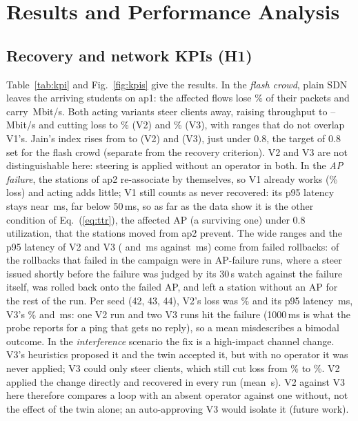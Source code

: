 \documentclass[conference]{IEEEtran}
\begin{document}
\section{Results and Performance Analysis}
\begin{table}[t]
\caption{KPIs of the affected flows (mean and [smallest--largest] over the three seeds; with so few seeds no interval is given). $\geq$ marks a recovery time that includes runs that never recovered (their number in brackets), counted at the run end.}
\label{tab:kpi}
\centering\small

\end{table}

\subsection{Recovery and network KPIs (H1)}
Table~\ref{tab:kpi} and Fig.~\ref{fig:kpis} give the results. In the \emph{flash crowd}, plain SDN leaves the arriving students on ap1: the affected flows lose \KpiFlashLossVone\% of their packets and carry \KpiFlashThrVone\,Mbit/s. Both acting variants steer clients away, raising throughput to \KpiFlashThrVtwo--\KpiFlashThrVthree\,Mbit/s and cutting loss to \KpiFlashLossVtwo\% (V2) and \KpiFlashLossVthree\% (V3), with ranges that do not overlap V1's. Jain's index rises from \FairJainVone{} to \FairJainVtwo{} (V2) and \FairJainVthree{} (V3), just under 0.8, the target of 0.8 set for the flash crowd (separate from the recovery criterion). V2 and V3 are not distinguishable here: steering is applied without an operator in both. In the \emph{AP failure}, the stations of ap2 re-associate by themselves, so V1 already works (\KpiApFailLossVone\% loss) and acting adds little; V1 still counts as never recovered: its p95 latency stays near \KpiApFailLatVone\,ms, far below 50\,ms, so as far as the data show it is the other condition of Eq.~(\ref{eq:ttr}), the affected AP (a surviving one) under 0.8 utilization, that the stations moved from ap2 prevent. The wide ranges and the p95 latency of V2 and V3 (\KpiApFailLatVtwo{} and \KpiApFailLatVthree\,ms against \KpiApFailLatVone\,ms) come from failed rollbacks: \RbFailApFail{} of the \RbFailAll{} rollbacks that failed in the campaign were in AP-failure runs, where a steer issued shortly before the failure was judged by its 30\,s watch against the failure itself, was rolled back onto the failed AP, and left a station without an AP for the rest of the run. Per seed (42, 43, 44), V2's loss was \PerSeedLossApFailVtwo\% and its p95 latency \PerSeedLatApFailVtwo\,ms, V3's \PerSeedLossApFailVthree\% and \PerSeedLatApFailVthree\,ms: one V2 run and two V3 runs hit the failure (1000\,ms is what the probe reports for a ping that gets no reply), so a mean misdescribes a bimodal outcome. In the \emph{interference} scenario the fix is a high-impact channel change. V3's heuristics proposed it and the twin accepted it, but with no operator it was never applied; V3 could only steer clients, which still cut loss from \KpiCochanLossVone\% to \KpiCochanLossVthree\%. V2 applied the change directly and recovered in every run (mean \KpiCochanTtrVtwo\,s). V2 against V3 here therefore compares a loop with an absent operator against one without, not the effect of the twin alone; an auto-approving V3 would isolate it (future work).
\end{document}
